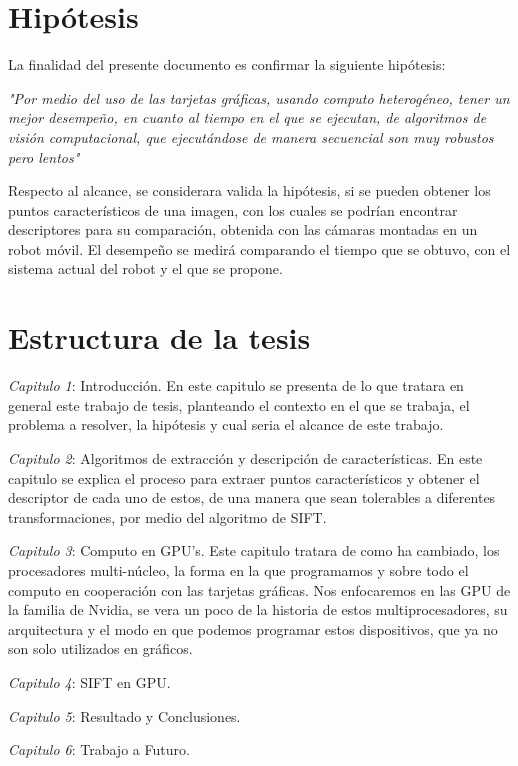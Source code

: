 \section{Hipótesis} 

La finalidad del presente documento es  confirmar la siguiente hipótesis:

\begin{center}
\textit{"Por medio del uso de las tarjetas gráficas, usando computo heterogéneo, tener un mejor desempeño, en cuanto al tiempo en el que se ejecutan, de algoritmos de visión computacional, que ejecutándose de manera secuencial son muy robustos pero lentos"}

\end{center}

Respecto al alcance, se considerara valida la hipótesis, si se pueden obtener los puntos característicos de una imagen, con los cuales se podrían encontrar descriptores para su comparación, obtenida con las cámaras montadas en un robot móvil. El desempeño se medirá comparando el tiempo que se obtuvo, con el sistema actual del robot y el que se propone.  


\section{Estructura de la tesis}

\textit{Capitulo 1}: Introducción. En este capitulo se presenta de lo que tratara en general este trabajo de tesis, planteando el contexto en el que se trabaja, el problema a resolver, la hipótesis y cual seria el alcance de este trabajo.

\textit{Capitulo 2}: Algoritmos de extracción y descripción de características. En este capitulo se explica el proceso para extraer puntos característicos y obtener el descriptor de cada uno de estos, de una manera que sean tolerables a diferentes transformaciones, por medio del algoritmo de SIFT.


\textit{Capitulo 3}: Computo en GPU's.  Este capitulo tratara de como ha cambiado, los procesadores multi-núcleo, la forma en la que programamos y sobre todo el computo en cooperación con las tarjetas gráficas. Nos enfocaremos en las GPU de la familia de Nvidia, se vera un poco de la historia de estos multiprocesadores, su arquitectura y el modo en que podemos programar estos dispositivos, que ya no son solo utilizados en gráficos.



\textit{Capitulo 4}: SIFT en GPU.

\textit{Capitulo 5}: Resultado y Conclusiones.

\textit{Capitulo 6}: Trabajo a Futuro. 






